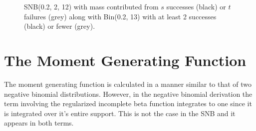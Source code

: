 \documentclass[review]{elsarticle}
\begin{document}
\begin{figure}[t!]
\centering
{}
\hfill
{}
\caption{
SNB(0.2, 2, 12) with mass contributed from 
$s$ successes (black) or $t$ failures (grey) along with Bin(0.2, 13) with
at least 2 successes (black) or fewer (grey).
}
\label{fig:snb_bin_compare}
\end{figure}

\section{The Moment Generating Function}

The moment generating function is calculated in a manner similar to 
that of two negative binomial distributions. However, in the negative
binomial derivation the
term involving the regularized incomplete beta function integrates to
one since it is integrated over it's entire support. This is not the
case in the SNB and it appears in both terms.
\end{document}
